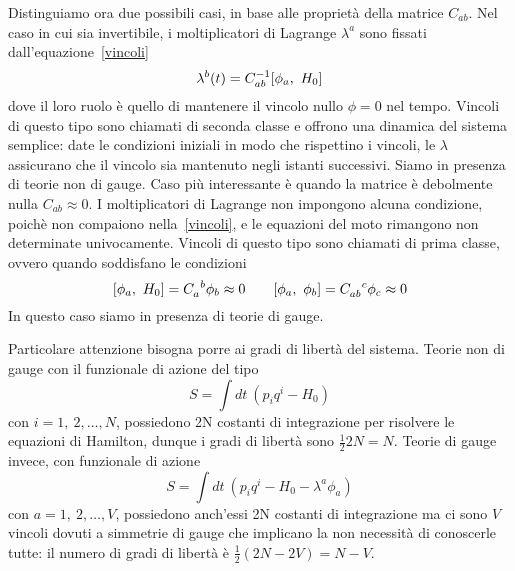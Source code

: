     Distinguiamo ora due possibili casi, in base alle proprietà della matrice $C_{ab}$. 
    Nel caso in cui sia invertibile, i moltiplicatori di Lagrange $\lambda^a$ sono fissati dall'equazione~\eqref{vincoli}
    \begin{equation}
        \lambda^b (t) = C^{-1}_{ab} [\phi_a, ~H_0]
    \end{equation}
    dove il loro ruolo è quello di mantenere il vincolo nullo $\phi = 0$ nel tempo. Vincoli di questo tipo sono chiamati di seconda classe e offrono una dinamica del sistema semplice: date le condizioni iniziali in modo che rispettino i vincoli, le $\lambda$ assicurano che il vincolo sia mantenuto negli istanti successivi. Siamo in presenza di teorie non di gauge.
    Caso più interessante è quando la matrice è debolmente nulla $C_{ab} \approx 0$. I moltiplicatori di Lagrange non impongono alcuna condizione, poichè non compaiono nella~\eqref{vincoli}, e le equazioni del moto rimangono non determinate univocamente. Vincoli di questo tipo sono chiamati di prima classe, ovvero quando soddisfano le condizioni
    \begin{equation} \label{secondaclasse}
        \poi{\phi_a}{H_0} = C_a^{\phantom a b} \phi_b \approx 0 \qquad \poi{\phi_a}{\phi_b} = C_{ab}^{\phantom{ab} c} \phi_c \approx 0
    \end{equation}
    In questo caso siamo in presenza di teorie di gauge.
    
    \hfill 

    Particolare attenzione bisogna porre ai gradi di libertà del sistema. Teorie non di gauge con il funzionale di azione del tipo 
    \begin{equation*}
        S = \int dt ~ (p_i q^i - H_0)
    \end{equation*}
    con $i=1,~2, \ldots, N$, possiedono 2N costanti di integrazione per risolvere le equazioni di Hamilton, dunque i gradi di libertà sono $\frac{1}{2} 2N = N$. Teorie di gauge invece, con funzionale di azione
    \begin{equation*}
        S = \int dt ~(p_i q^i - H_0 - \lambda^a \phi_a)
    \end{equation*}
    con $a=1,~2, \ldots, V$, possiedono anch'essi 2N costanti di integrazione ma ci sono $V$ vincoli dovuti a simmetrie di gauge che implicano la non necessità di conoscerle tutte: il numero di gradi di libertà è $\frac{1}{2} (2N - 2V) = N - V$.

